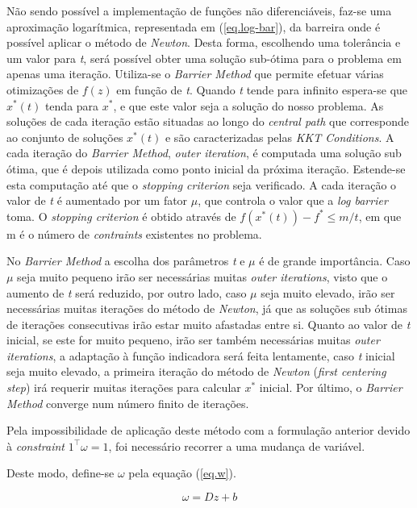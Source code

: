 \documentclass[a4paper]{IEEEtran}
\begin{document}
Não sendo possível a implementação de funções não diferenciáveis, faz-se uma aproximação logarítmica, representada em (\ref{eq.log-bar}), da barreira onde é possível aplicar o método de \textit{Newton}. Desta forma, escolhendo uma tolerância e um valor para \textit{t}, será possível obter uma solução sub-ótima para o problema em apenas uma iteração. Utiliza-se o \textit{Barrier Method} que permite efetuar várias otimizações de $f(z)$ em função de \textit{t}.
Quando \textit{t} tende para infinito espera-se que $x^\ast(t)$ tenda para $x^\ast$, e que este valor seja a solução do nosso problema. As soluções de cada iteração estão situadas ao longo do \textit{central path} que corresponde ao conjunto de soluções $x^\ast(t)$ e são caracterizadas pelas \textit{KKT Conditions}. A cada iteração do \textit{Barrier Method}, \textit{outer iteration}, é computada uma solução sub ótima, que é depois utilizada como ponto inicial da próxima iteração. Estende-se esta computação até que o \textit{stopping criterion} seja verificado. 
A cada iteração o valor de \textit{t} é aumentado por um fator $\mu$, que controla o valor que a \textit{log barrier} toma. O \textit{stopping criterion} é obtido através de $f(x^\ast(t))-f^\ast \leq m/t$, em que m é o número de \textit{contraints} existentes no problema.

No \textit{Barrier Method} a escolha dos parâmetros \textit{t} e $\mu$ é de grande importância. Caso $\mu$ seja muito pequeno irão ser necessárias muitas \textit{outer iterations}, visto que o aumento de \textit{t} será reduzido, por outro lado, caso $\mu$ seja muito elevado, irão ser necessárias muitas iterações do método de \textit{Newton}, já que as soluções sub ótimas de iterações consecutivas irão estar muito afastadas entre si. Quanto ao valor de \textit{t} inicial, se este for muito pequeno, irão ser também necessárias muitas \textit{outer iterations}, a adaptação à função indicadora será feita lentamente, caso \textit{t} inicial seja muito elevado, a primeira iteração do método de \textit{Newton} (\textit{first centering step}) irá requerir muitas iterações para calcular $x^\ast$ inicial.
Por último, o \textit{Barrier Method} converge num número finito de iterações.


Pela impossibilidade de aplicação deste método com a formulação anterior devido à \textit{constraint} \: $1^\top\omega=1$, foi necessário recorrer a uma mudança de variável.

Deste modo, define-se $\omega$ pela equação (\ref{eq.w}). 

\begin{equation}
\label{eq.w}
\omega = D z + b
\end{equation}
\end{document}
